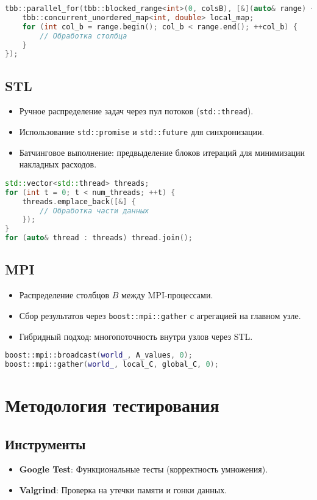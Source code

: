 \documentclass[a4paper,12pt]{article}
\begin{document}
\begin{lstlisting}[language=C++]
tbb::parallel_for(tbb::blocked_range<int>(0, colsB), [&](auto& range) {
    tbb::concurrent_unordered_map<int, double> local_map;
    for (int col_b = range.begin(); col_b < range.end(); ++col_b) {
        // Обработка столбца
    }
});
\end{lstlisting}

\subsection{STL}
\begin{itemize}
\item Ручное распределение задач через пул потоков (\texttt{std::thread}).
\item Использование \texttt{std::promise} и \texttt{std::future} для синхронизации.
\item Батчинговое выполнение: предвыделение блоков итераций для минимизации накладных расходов.
\end{itemize}

\begin{lstlisting}[language=C++]
std::vector<std::thread> threads;
for (int t = 0; t < num_threads; ++t) {
    threads.emplace_back([&] {
        // Обработка части данных
    });
}
for (auto& thread : threads) thread.join();
\end{lstlisting}

\subsection{MPI}
\begin{itemize}
\item Распределение столбцов \( B \) между MPI-процессами.
\item Сбор результатов через \texttt{boost::mpi::gather} с агрегацией на главном узле.
\item Гибридный подход: многопоточность внутри узлов через STL.
\end{itemize}

\begin{lstlisting}[language=C++]
boost::mpi::broadcast(world_, A_values, 0);
boost::mpi::gather(world_, local_C, global_C, 0);
\end{lstlisting}

\section{Методология тестирования}
\subsection{Инструменты}
\begin{itemize}
\item \textbf{Google Test}: Функциональные тесты (корректность умножения).
\item \textbf{Valgrind}: Проверка на утечки памяти и гонки данных.
\end{itemize}
\end{document}
